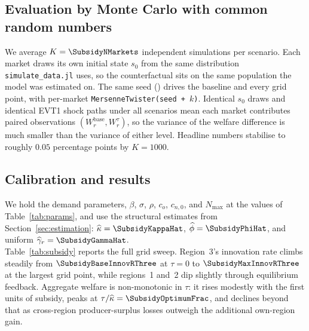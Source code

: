 \documentclass[12pt]{article}
\begin{document}
\subsection{Evaluation by Monte Carlo with common random numbers}

We average $K = \SubsidyNMarkets$ independent simulations per scenario.
Each market draws its own initial state $s_0$ from the same distribution
\texttt{simulate\_data.jl} uses, so the counterfactual sits on the same
population the model was estimated on. The same seed (\SubsidySeed)
drives the baseline and every grid point, with per-market
\texttt{MersenneTwister(seed + $k$)}. Identical $s_0$ draws and
identical EVT1 shock paths under all scenarios mean each market
contributes paired observations $(W_r^{\mathrm{base}},
W_r^{\tau})$, so the variance of the welfare difference is much smaller
than the variance of either level. Headline numbers stabilise to roughly
$0.05$ percentage points by $K = 1000$.

\subsection{Calibration and results}

We hold the demand parameters, $\beta$, $\sigma$, $\rho$, $c_o$, $c_{n,0}$,
and $N_{\max}$ at the values of Table~\ref{tab:params}, and use the
structural estimates from Section~\ref{sec:estimation}: $\widehat{\kappa} =
\SubsidyKappaHat$, $\widehat{\phi} = \SubsidyPhiHat$, and uniform
$\widehat{\gamma}_r = \SubsidyGammaHat$.\\

Table~\ref{tab:subsidy} reports the full grid sweep. Region~3's
innovation rate climbs steadily from $\SubsidyBaseInnovRThree$ at $\tau =
0$ to $\SubsidyMaxInnovRThree$ at the largest grid point, while regions~1
and~2 dip slightly through equilibrium feedback. Aggregate welfare is
non-monotonic in $\tau$: it rises modestly with the first units of
subsidy, peaks at $\tau / \widehat{\kappa} = \SubsidyOptimumFrac$, and
declines beyond that as cross-region producer-surplus losses outweigh
the additional own-region gain.\\

\begin{table}[ht]
  \centering
  \caption{Region-3 innovation subsidy: grid sweep over $\tau / \widehat{\kappa}$}
  \medskip
  \label{tab:subsidy}
  
  \caption*{\footnotesize Notes: Monte Carlo over $K = \SubsidyNMarkets$
    independent markets, each drawing its own $s_0$ from the DGP used by
    \texttt{simulate\_data.jl}; common random numbers across all
    scenarios (seed = \SubsidySeed). Calibration: $\widehat{\kappa} =
    \SubsidyKappaHat$, $\widehat{\phi} = \SubsidyPhiHat$, uniform
    $\widehat{\gamma}_r = \SubsidyGammaHat$. The subsidy is region-3
    only: $(0, 0, \tau)$. Welfare is computed under sovereign funding,
    so the transfer cancels within region~3. CS allocated equally
    across the three regions; PS$_r$ aggregates own-region firms'
    profits in both periods; costs paid charges the full
    $\kappa\, k^{\mathrm{innov}}_r + \phi\, k^{\mathrm{enter}}_r$ to
    region~$r$.}
\end{table}
\end{document}

